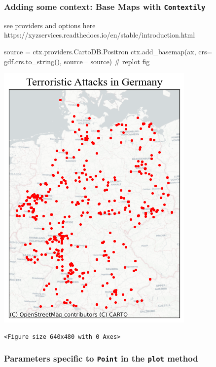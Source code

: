 \documentclass[
  letterpaper,
  DIV=11,
  numbers=noendperiod]{scrreprt}
\newenvironment{Shaded}{\begin{snugshade}}{\end{snugshade}}
\newcommand{\CommentTok}[1]{\textcolor[rgb]{0.37,0.37,0.37}{#1}}
\newcommand{\NormalTok}[1]{\textcolor[rgb]{0.00,0.23,0.31}{#1}}
\newcommand{\OperatorTok}[1]{\textcolor[rgb]{0.37,0.37,0.37}{#1}}
\begin{document}
\subsubsection{\texorpdfstring{Adding some context: Base Maps with
\texttt{Contextily}}{Adding some context: Base Maps with Contextily}}\label{adding-some-context-base-maps-with-contextily}

see providers and options here
https://xyzservices.readthedocs.io/en/stable/introduction.html

\begin{Shaded}
\begin{Highlighting}[]
\NormalTok{source }\OperatorTok{=}\NormalTok{ ctx.providers.CartoDB.Positron}
\NormalTok{ctx.add\_basemap(ax, crs}\OperatorTok{=}\NormalTok{ gdf.crs.to\_string(), source}\OperatorTok{=}\NormalTok{ source)}
\CommentTok{\# replot}
\NormalTok{fig}
\end{Highlighting}
\end{Shaded}

\includegraphics{labs/w02_maps_files/figure-pdf/cell-7-output-1.png}

\begin{verbatim}
<Figure size 640x480 with 0 Axes>
\end{verbatim}

\subsubsection{\texorpdfstring{Parameters specific to \texttt{Point} in
the \texttt{plot}
method}{Parameters specific to Point in the plot method}}\label{parameters-specific-to-point-in-the-plot-method}
\end{document}
